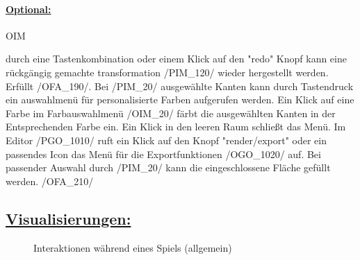%


\paragraph*{\underline{Optional:}}

\begin{ids}{\gls{OIM}}

	\id[10] durch eine Tastenkombination oder einem Klick auf den "redo" Knopf kann eine rückgängig gemachte transformation /PIM\_120/ wieder hergestellt werden. Erfüllt /OFA\_190/.
	\id[20] Bei /PIM\_20/ ausgewählte Kanten kann durch Tastendruck ein auswahlmenü für personalisierte Farben aufgerufen werden.
	\id[30] Ein Klick auf eine Farbe im Farbauswahlmenü /OIM\_20/ färbt die ausgewählten Kanten in der Entsprechenden Farbe ein. Ein Klick in den leeren Raum schließt das Menü.
	\id[40] Im Editor /PGO\_1010/ ruft ein Klick auf den Knopf "render/export" oder ein passendes Icon das Menü für die Exportfunktionen /OGO\_1020/ auf.
	\id[50] Bei passender Auswahl durch /PIM\_20/ kann die eingeschlossene Fläche gefüllt werden. /OFA\_210/ 

\end{ids}


\subsection*{\underline{Visualisierungen:}}

\begin{landscape}

	\begin{figure}[ht]
	  \centering
	  
	  \caption{Interaktionen während eines Spiels (allgemein)}
	\end{figure}

\end{landscape}

\clearpage
